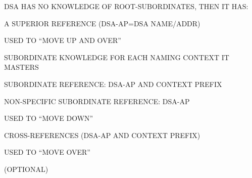 

\begin{bwslide}

\begin{nrtc}
\item	DSA HAS NO KNOWLEDGE OF ROOT-SUBORDINATES, THEN IT HAS:

\item	A SUPERIOR REFERENCE (DSA-AP=DSA NAME/ADDR)
    \begin{nrtc}
    \item	USED TO ``MOVE UP AND OVER''
    \end{nrtc}

\item	SUBORDINATE KNOWLEDGE FOR EACH NAMING CONTEXT IT MASTERS
    \begin{nrtc}
    \item	SUBORDINATE REFERENCE: DSA-AP AND CONTEXT PREFIX

    \item	NON-SPECIFIC SUBORDINATE REFERENCE: DSA-AP
    \end{nrtc}
    USED TO ``MOVE DOWN''

\item	CROSS-REFERENCES (DSA-AP AND CONTEXT PREFIX)
    \begin{nrtc}
    \item	USED TO ``MOVE OVER''
    \end{nrtc}
    (OPTIONAL)
\end{nrtc}
\end{bwslide}




